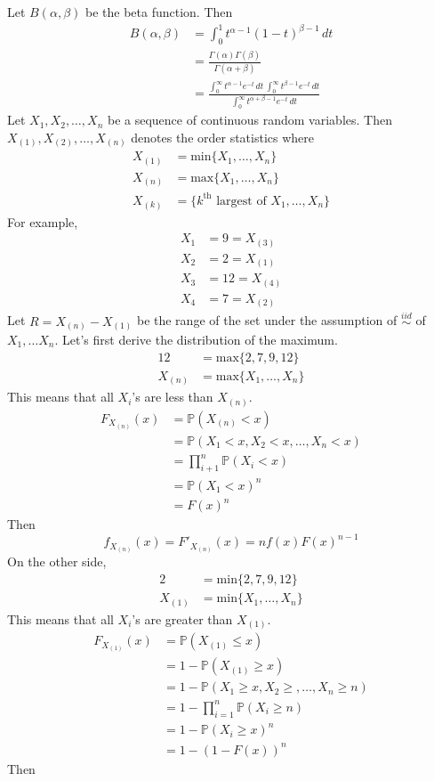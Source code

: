 \documentclass[12pt]{article}
\newcommand{\prob}[1]{\mathbb{P}(#1)}
\newcommand{\iid}{\stackrel{iid}{\sim}}
\newcommand{\set}[1]{\Big\{ #1 \Big\}}
\renewcommand{\max}[1]{\text{max}\{#1\}}
\renewcommand{\min}[1]{\text{min}\{#1\}}
\newcommand{\ostat}[2]{#1_{(#2)}}
\begin{document}
Let $B(\alpha, \beta)$ be the beta function. Then 
$$\begin{aligned} B(\alpha, \beta) &= \int_0^1 t^{\alpha - 1} (1 - t)^{\beta - 1} \, dt \\ &= \frac{\Gamma(\alpha)\Gamma(\beta)}{\Gamma(\alpha + \beta)} \\ &= \frac{\int_0^\infty t^{\alpha - 1}e^{-t} \, dt ~ \int_0^\infty t^{\beta - 1} e^{-t} \, dt}{\int_0^\infty t^{\alpha + \beta - 1} e^{-t} \, dt} \end{aligned} $$ 
Let $X_1, X_2, \dots, X_n$ be a sequence of continuous random variables. Then $\ostat{X}{1}, \ostat{X}{2}, \dots, \ostat{X}{n}$ denotes the order statistics where $$\begin{aligned} \ostat{X}{1} &= \text{min} \set{X_1, \dots, X_n} \\ \ostat{X}{n} &= \text{max} \set{X_1, \dots, X_n} \\ \ostat{X}{k} &= \set{k^{\text{th}} \text{ largest of } X_1, \dots, X_n} \end{aligned} $$ 
For example, $$\begin{aligned} X_1 &= 9 = \ostat{X}{3} \\ X_2 &= 2 = \ostat{X}{1} \\ X_3 &= 12 = \ostat{X}{4} \\ X_4 &= 7 = \ostat{X}{2} \end{aligned} $$ 
Let $R = \ostat{X}{n} - \ostat{X}{1}$ be the range of the set under the assumption of $\iid$ of $X_1, \dots X_n$. Let's first derive the distribution of the maximum. $$ \begin{aligned} 12 &= \max{2, 7, 9, 12} \\ \ostat{X}{n} &= \max{X_1, \dots, X_n} \end{aligned} $$ This means that all $X_i$'s are less than $\ostat{X}{n}$. $$\begin{aligned} F_{\ostat{X}{n}}(x) &= \prob{\ostat{X}{n} < x} \\ &= \prob{X_1 < x, X_2 < x, \dots, X_n < x} \\ &= \prod_{i + 1}^n \prob{X_i < x} \\ &= \prob{X_1 < x}^n \\ &= F(x)^n \end{aligned} $$ Then $$f_{\ostat{X}{n}}(x) = F'_{\ostat{X}{n}}(x) = nf(x)F(x)^{n-1} $$ On the other side, $$ \begin{aligned} 2 &= \min{2, 7, 9, 12} \\ \ostat{X}{1} &= \min{X_1, \dots, X_n} \end{aligned} $$ This means that all $X_i$'s are greater than $\ostat{X}{1}$. $$\begin{aligned} F_{\ostat{X}{1}}(x) &= \prob{\ostat{X}{1} \leq x} \\ &= 1 - \prob{\ostat{X}{1} \geq x} \\ &= 1 - \prob{X_1 \geq x, X_2 \geq , \dots, X_n \geq n} \\ &= 1 - \prod_{i = 1}^n \prob{X_i \geq n} \\ &= 1 - \prob{X_i \geq x}^n \\ &= 1 - (1 - F(x))^n \end{aligned} $$ Then 
\end{document}
